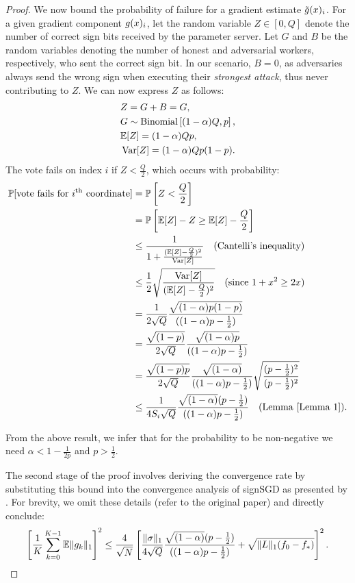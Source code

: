 \begin{proof}
We now bound the probability of failure for a gradient estimate $\tilde{g}(x)_i$. For a given gradient component $g(x)_i$, let the random variable $Z \in [0, Q]$ denote the number of correct sign bits received by the parameter server. Let $G$ and $B$ be the random variables denoting the number of honest and adversarial workers, respectively, who sent the correct sign bit. In our scenario, $B = 0$, as adversaries always send the wrong sign when executing their \emph{strongest attack}, thus never contributing to $Z$. We can now express $Z$ as follows:
\begin{align*}
    &Z = G + B = G, \\
    &G \sim \text{Binomial}\left[(1 - \alpha)Q, p\right], \\
    &\mathbb{E}[Z] = (1 - \alpha)Qp, \\
    &\operatorname{Var}[Z] = (1 - \alpha)Q p(1 - p).
\end{align*}
 The vote fails on index $i$ if $Z < \frac{Q}{2}$, which occurs with probability:
\begin{align*}
    \Prob[\text{vote fails for }  i^\text{th} \text{ coordinate}] %
    &=\Prob\left[Z < \frac{Q}{2}\right] \\
    &= \Prob\left[\E[Z] - Z \geq \E[Z] - \frac{Q}{2}\right] \\
    &\leq \frac{1}{1 + \frac{(\E[Z] - \frac{Q}{2})^2}{\Var[Z]}} \quad \text{(Cantelli's inequality)} \\
    &\leq \frac{1}{2}\sqrt{\frac{\Var[Z]}{(\E[Z] - \frac{Q}{2})^2}} \quad \text{(since } 1 + x^2 \geq 2x \text{)} \\
    &= \frac{1}{2\sqrt{Q}}\frac{\sqrt{(1 - \alpha)p(1- p)}}{((1 - \alpha)p - \frac{1}{2})} \\
    &= \frac{\sqrt{(1- p)}}{2\sqrt{Q}}\frac{\sqrt{(1 - \alpha)p}}{((1 - \alpha)p - \frac{1}{2})} \\
    &= \frac{\sqrt{(1- p)p}}{2\sqrt{Q}}\frac{\sqrt{(1 - \alpha)}}{((1 - \alpha)p - \frac{1}{2})}\sqrt{\frac{(p - \frac{1}{2})^2}{(p - \frac{1}{2})^2}}\\
    &\leq \frac{1}{4S_i\sqrt{Q}}\frac{\sqrt{(1 - \alpha)}(p - \frac{1}{2})}{((1 - \alpha)p - \frac{1}{2})} \quad \text{(Lemma \ref{Lemma 1}).}
\end{align*}

From the above result, we infer that for the probability to be non-negative we need $\alpha < 1 - \frac{1}{2p}$ and $p > \frac{1}{2}$.

The second stage of the proof involves deriving the convergence rate by substituting this bound into the convergence analysis of signSGD as presented by \cite{bernstein2018signsgd}. For brevity, we omit these details (refer to the original paper) and directly conclude:
\begin{equation*}
\begin{split}
    \left[\frac{1}{K}\sum^{K - 1}_{k = 0} \mathbb{E}\|g_k\|_1\right]^2 \leq \frac{4}{\sqrt{N}} \left[\frac{\|\sigma\|_1}{4\sqrt{Q}}\frac{\sqrt{(1 - \alpha)}(p - \frac{1}{2})}{((1 - \alpha)p - \frac{1}{2})} + \sqrt{\|L\|_1(f_0 - f_*)}\right]^2.
\end{split}
\end{equation*}
\end{proof}

